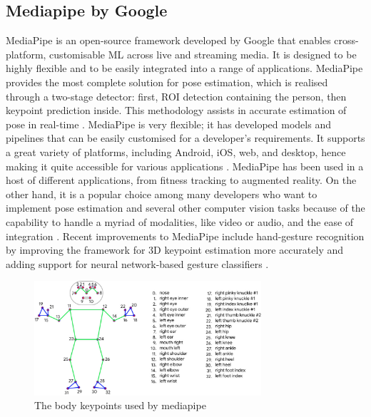     \subsection{Mediapipe by Google}
        MediaPipe is an open-source framework developed by Google that enables cross-platform, customisable ML across live and streaming media. It is designed to be highly flexible and to be easily integrated into a range of applications. MediaPipe provides the most complete solution for pose estimation, which is realised through a two-stage detector: first, ROI detection containing the person, then keypoint prediction inside. This methodology assists in accurate estimation of pose in real-time \citep{lugaresi2019mediapipe}. MediaPipe is very flexible; it has developed models and pipelines that can be easily customised for a developer's requirements. It supports a great variety of platforms, including Android, iOS, web, and desktop, hence making it quite accessible for various applications \citep{google2023mediapipe}. MediaPipe has been used in a host of different applications, from fitness tracking to augmented reality. On the other hand, it is a popular choice among many developers who want to implement pose estimation and several other computer vision tasks because of the capability to handle a myriad of modalities, like video or audio, and the ease of integration \citep{lugaresi2019mediapipe}. Recent improvements to MediaPipe include hand-gesture recognition by improving the framework for 3D keypoint estimation more accurately and adding support for neural network-based gesture classifiers \citep{sung2021device}.

        \begin{figure}[htbp]
            \centering
            \includegraphics[width=0.75\textwidth]{figures/mediapipe.png}
            \caption{The body keypoints used by mediapipe}
            \label{fig:mediapipe}
        \end{figure}
